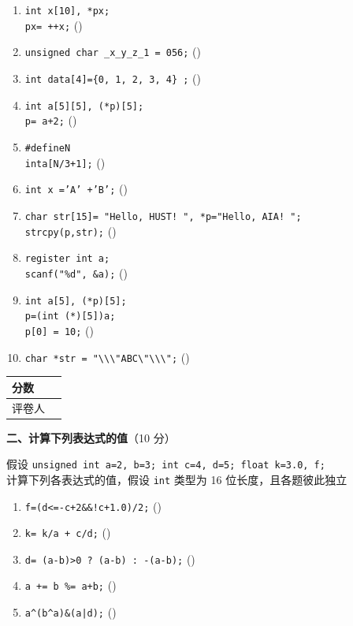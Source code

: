 \documentclass[a4paper,11pt]{ctexart}
\newcommand{\ansbox}{\hfill(\qquad\quad)}
\newcommand{\secbox}[2]{%
  \noindent\begin{tabular}{|>{\centering\arraybackslash}m{1.5cm}|>{\centering\arraybackslash}m{1.5cm}|}
    \hline
    分数 & \\ \hline
    评卷人 & \\ \hline
  \end{tabular}\hspace{0.8em}%
  \begin{minipage}[c]{\dimexpr\textwidth-4.2cm\relax}
    \textbf{#1}#2
  \end{minipage}\par\vspace{0.5em}%
}
\begin{document}
\begin{enumerate}[label=(\arabic*), leftmargin=2.4em, itemsep=3pt]
  \item \texttt{int x[10], *px;}\\
        \texttt{px= ++x;} \ansbox
  \item \texttt{unsigned char \_x\_y\_z\_1 = 056;} \ansbox
  \item \texttt{int data[4]=\{0, 1, 2, 3, 4\} ;} \ansbox
  \item \texttt{int a[5][5], (*p)[5];}\\
        \texttt{p= a+2;} \ansbox
  \item \texttt{\#define\quad N}\\
        \texttt{int\quad a[N/3+1];} \ansbox
  \item \texttt{int x ='A' +'B';} \ansbox
  \item \texttt{char str[15]= "Hello, HUST! ", *p="Hello, AIA! ";}\\
        \texttt{strcpy(p,str);} \ansbox
  \item \texttt{register int a;}\\
        \texttt{scanf("\%d", \&a);} \ansbox
  \item \texttt{int a[5], (*p)[5];}\\
        \texttt{p=(int (*)[5])a;}\\
        \texttt{p[0] = 10;} \ansbox
  \item \texttt{char *str = "\textbackslash\textbackslash\textbackslash"ABC\textbackslash"\textbackslash\textbackslash\textbackslash";} \ansbox
\end{enumerate}

\vspace{8pt}

\secbox{二、计算下列表达式的值}{（10 分）}

\noindent 假设 \texttt{unsigned int a=2, b=3; int c=4, d=5; float k=3.0, f;}\\
计算下列各表达式的值，假设 \texttt{int} 类型为 16 位长度，且各题彼此独立

\begin{enumerate}[label=(\arabic*), leftmargin=2.4em, itemsep=3pt]
  \item \texttt{f=(d<=-c+2\&\&!c+1.0)/2;} \ansbox
  \item \texttt{k= k/a + c/d;} \ansbox
  \item \texttt{d= (a-b)>0 ? (a-b) : -(a-b);} \ansbox
  \item \texttt{a += b \%= a+b;} \ansbox
  \item \texttt{a\^{}(b\^{}a)\&(a|d);} \ansbox
\end{enumerate}
\end{document}

